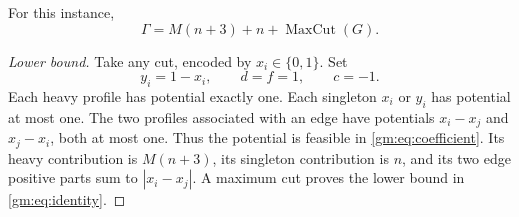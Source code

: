 \begin{lemma}\label{gm:lem:identity}
For this instance,
\begin{equation}\label{gm:eq:identity}
\Gamma=M(n+3)+n+\operatorname{MaxCut}(G).
\end{equation}
\end{lemma}

\begin{proof}[Lower bound]
Take any cut, encoded by $x_i\in\{0,1\}$. Set
\[
y_i=1-x_i,\qquad d=f=1,\qquad c=-1.
\]
Each heavy profile has potential exactly one. Each singleton $x_i$ or $y_i$ has potential at most one. The two profiles associated with an edge have potentials $x_i-x_j$ and $x_j-x_i$, both at most one. Thus the potential is feasible in \eqref{gm:eq:coefficient}. Its heavy contribution is $M(n+3)$, its singleton contribution is $n$, and its two edge positive parts sum to $|x_i-x_j|$. A maximum cut proves the lower bound in \eqref{gm:eq:identity}.
\end{proof}

